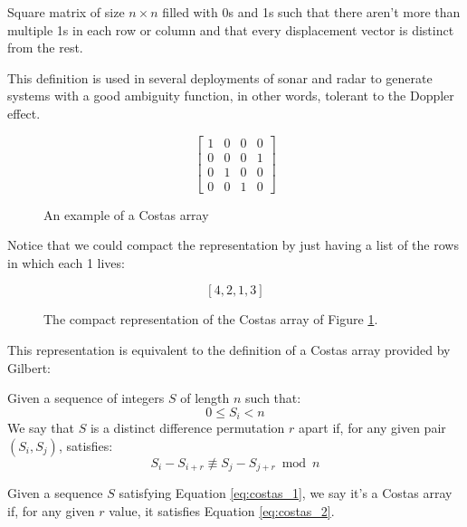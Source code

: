 \begin{definition}
  Square matrix of size $n×n$ filled with 0s and 1s such that there
  aren't more than multiple 1s in each row or column and that every
  displacement vector is distinct from the rest.
\end{definition}

This definition is used in several deployments of sonar and radar to generate
systems with a good ambiguity function, in other words, tolerant to the Doppler
effect.

\begin{figure}[ht!]
  $$
  \begin{bmatrix}
   1&0&0&0\\
   0&0&0&1\\
   0&1&0&0\\
   0&0&1&0
  \end{bmatrix}
  $$
  \caption{An example of a Costas array}
  \label{fig:costas_1}
\end{figure}

Notice that we could compact the representation by just having a list of the
rows in which each 1 lives:

\begin{figure}[ht!]
  $$[4, 2, 1, 3]$$
  \caption{The compact representation of the Costas array of Figure
  \ref{fig:costas_1}.}
  \label{fig:costas_2}
\end{figure}

This representation is equivalent to the definition of a Costas array provided
by Gilbert:

\begin{definition}\label{def:costas_1}
  Given a sequence of integers $S$ of length $n$ such that:
    \begin{equation}\label{eq:costas_1}
      0 \leq S_{i} < n
    \end{equation}
  We say that $S$ is a distinct difference permutation $r$ apart if,
  for any given pair $(S_{i}, S_{j})$, satisfies:
    \begin{equation}\label{eq:costas_2}
      S_{i} - S_{i+r} \not \equiv S_{j} - S_{j+r} \bmod n
    \end{equation}
\end{definition}

\begin{definition}
  Given a sequence $S$ satisfying Equation \eqref{eq:costas_1}, we say it's a
  Costas array if, for any given $r$ value, it satisfies Equation
  \eqref{eq:costas_2}.
\end{definition}

